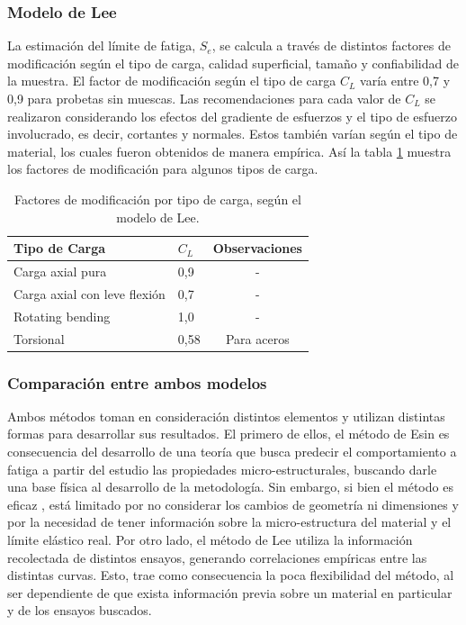 \subsubsection{Modelo de Lee}
La estimación del límite de fatiga, $S_e$, se calcula a través de distintos factores de modificación según el tipo de carga, calidad superficial, tamaño y confiabilidad de la muestra. El factor de modificación según el tipo de carga $C_L$ varía entre 0,7 y 0,9 para probetas sin muescas. Las recomendaciones para cada valor de $C_L$ se realizaron considerando los efectos del gradiente de esfuerzos y el tipo de esfuerzo involucrado, es decir, cortantes y normales. Estos también varían según el tipo de material, los cuales fueron obtenidos de manera empírica. Así la tabla \ref{tab:lee_factor} muestra los factores de modificación para algunos tipos de carga.

\begin{table}[h]
\centering
\begin{tabular}{@{}llc@{}}
\toprule
Tipo de Carga                & $C_L$ & Observaciones \\ \midrule
Carga axial pura             & 0,9   & -                                 \\
Carga axial con leve flexión & 0,7   & -                                 \\
Rotating bending             & 1,0   & -                                 \\
Torsional                    & 0,58  & Para aceros   \\ \bottomrule
\end{tabular}
\caption{Factores de modificación por tipo de carga, según el modelo de Lee.}
\label{tab:lee_factor}
\end{table}

\subsubsection{Comparación entre ambos modelos}

Ambos métodos toman en consideración distintos elementos y utilizan distintas formas para desarrollar sus resultados. El primero de ellos, el método de Esin es consecuencia del desarrollo de una teoría que busca predecir el comportamiento a fatiga a partir del estudio las propiedades micro-estructurales, buscando darle una base física al desarrollo de la metodología. Sin embargo, si bien el método es eficaz \cite{strzelecki2018analysis}, está limitado por no considerar los cambios de geometría ni dimensiones y por la necesidad de tener información sobre la micro-estructura del material y el límite elástico real. Por otro lado, el método de Lee utiliza la información recolectada de distintos ensayos, generando correlaciones empíricas entre las distintas curvas. Esto, trae como consecuencia la poca flexibilidad del método, al ser dependiente de que exista información previa sobre un material en particular y de los ensayos buscados.

